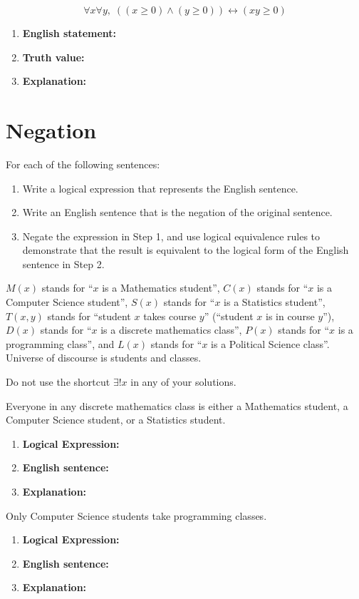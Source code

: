 \documentclass[]{article}
\begin{document}
\begin{question}{1.10}
\[
\forall x\forall y,\; ((x \ge 0) \land (y \ge 0)) \leftrightarrow (xy \ge 0)
\]
\end{question}
\begin{enumerate}[label=(\alph*)]
    \item \textbf{English statement:}
    \item \textbf{Truth value:}
    \item \textbf{Explanation:}
\end{enumerate}
\section{Negation}
For each of the following sentences:
\begin{enumerate}[label=(\alph*)]
  \item Write a logical expression that represents the English sentence.
  \item Write an English sentence that is the negation of the original sentence.
  \item Negate the expression in Step 1, and use logical equivalence rules to
  demonstrate that the result is equivalent to the logical form of the English sentence in Step 2.
\end{enumerate}

$M(x)$ stands for “$x$ is a Mathematics student”, $C(x)$ stands for “$x$ is a Computer Science student”, $S(x)$ stands
for “$x$ is a Statistics student”, $T(x, y)$ stands for “student $x$ takes course $y$” (“student $x$ is in course $y$”), $D(x)$ stands
for “$x$ is a discrete mathematics class”, $P(x)$ stands for “$x$ is a programming class”, and $L(x)$ stands for “$x$ is a
Political Science class”. Universe of discourse is students and classes. 

Do not use the shortcut $\exists!x$ in any of your solutions.
\begin{question}{2.1}
Everyone in any discrete mathematics class is either a Mathematics student, a Computer Science student, or a Statistics student.
\end{question}
\begin{enumerate}[label=(\alph*)]
    \item \textbf{Logical Expression:}
    \item \textbf{English sentence:}
    \item \textbf{Explanation:}
\end{enumerate}

\begin{question}{2.2}
Only Computer Science students take programming classes.
\end{question}
\begin{enumerate}[label=(\alph*)]
    \item \textbf{Logical Expression:}
    \item \textbf{English sentence:}
    \item \textbf{Explanation:}
\end{enumerate}
\end{document}
